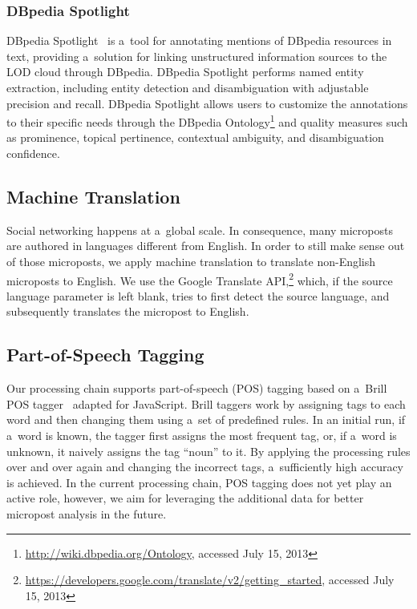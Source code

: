 \subsubsection{DBpedia Spotlight}

DBpedia Spotlight~\cite{mendes2011dbpediaspotlight}
is a~tool for annotating mentions of DBpedia resources in text,
providing a~solution for linking unstructured information sources
to the LOD cloud through DBpedia.
DBpedia Spotlight performs named entity extraction,
including entity detection and disambiguation
with adjustable precision and recall.
DBpedia Spotlight allows users to customize the annotations
to their specific needs through the DBpedia
Ontology\footnote{\url{http://wiki.dbpedia.org/Ontology},
accessed July 15, 2013}
and quality measures such as prominence, topical pertinence,
contextual ambiguity, and disambiguation confidence.

\subsection{Machine Translation}
\label{sec:machine-translation}

Social networking happens at a~global scale.
In consequence, many microposts are authored
in languages different from English.
In order to still make sense out of those microposts,
we apply machine translation to translate non-English microposts
to English.
We use the Google Translate
API,\footnote{\url{https://developers.google.com/translate/v2/getting_started},
accessed July 15, 2013}
which, if the source language parameter is left blank,
tries to first detect the source language,
and subsequently translates the micropost to English.

\subsection{Part-of-Speech Tagging}
\label{sec:part-of-speech-tagging}

Our processing chain supports part-of-speech (POS) tagging
based on a~Brill POS tagger~\cite{brill1992pos} adapted for JavaScript.
Brill taggers work by assigning tags to each word and then changing them
using a~set of predefined rules.
In an initial run, if a~word is known, the tagger
first assigns the most frequent tag,
or, if a~word is unknown, it naively assigns the tag ``noun'' to it.
By applying the processing rules over and over again and
changing the incorrect tags, a~sufficiently high accuracy is achieved.
In the current processing chain, POS tagging does not yet
play an active role,
however, we aim for leveraging the additional data
for better micropost analysis in the future.

